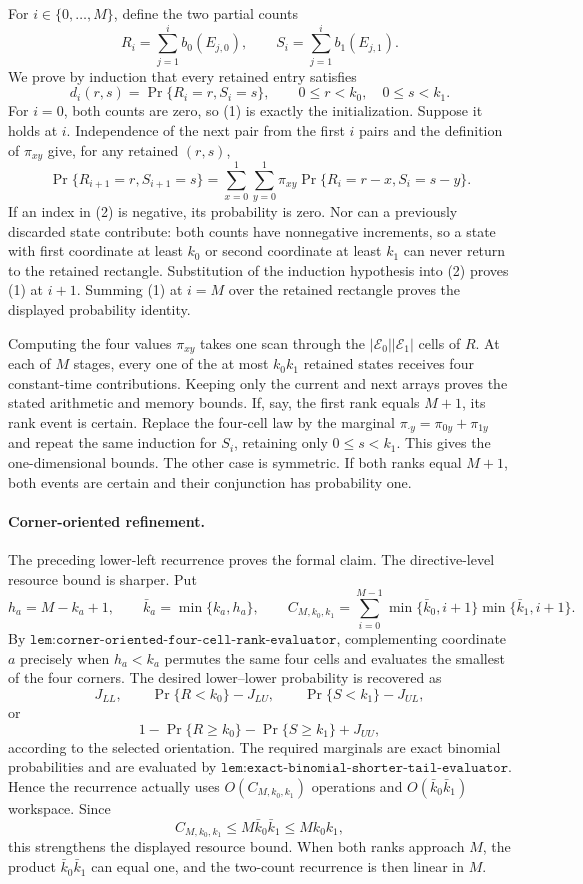 For \(i\in\{0,\ldots,M\}\), define the two partial counts
\[
R_i=\sum_{j=1}^i b_0(E_{j,0}),\qquad S_i=\sum_{j=1}^i b_1(E_{j,1}).
\]
We prove by induction that every retained entry satisfies
\[
d_i(r,s)=\Pr\{R_i=r,S_i=s\},\qquad 0\le r<k_0,\quad 0\le s<k_1.
\tag{1}
\]
For \(i=0\), both counts are zero, so (1) is exactly the initialization. Suppose it holds at \(i\). Independence of the next pair from the first \(i\) pairs and the definition of \(\pi_{xy}\) give, for any retained \((r,s)\),
\[
\Pr\{R_{i+1}=r,S_{i+1}=s\}
=\sum_{x=0}^1\sum_{y=0}^1\pi_{xy}\Pr\{R_i=r-x,S_i=s-y\}.
\tag{2}
\]
If an index in (2) is negative, its probability is zero. Nor can a previously discarded state contribute: both counts have nonnegative increments, so a state with first coordinate at least \(k_0\) or second coordinate at least \(k_1\) can never return to the retained rectangle. Substitution of the induction hypothesis into (2) proves (1) at \(i+1\). Summing (1) at \(i=M\) over the retained rectangle proves the displayed probability identity.

Computing the four values \(\pi_{xy}\) takes one scan through the \(|\mathscr E_0||\mathscr E_1|\) cells of \(R\). At each of \(M\) stages, every one of the at most \(k_0k_1\) retained states receives four constant-time contributions. Keeping only the current and next arrays proves the stated arithmetic and memory bounds. If, say, the first rank equals \(M+1\), its rank event is certain. Replace the four-cell law by the marginal \(\pi_{\cdot y}=\pi_{0y}+\pi_{1y}\) and repeat the same induction for \(S_i\), retaining only \(0\le s<k_1\). This gives the one-dimensional bounds. The other case is symmetric. If both ranks equal \(M+1\), both events are certain and their conjunction has probability one.
\paragraph{Corner-oriented refinement.}
The preceding lower-left recurrence proves the formal claim. The directive-level resource bound is sharper. Put
\[
h_a=M-k_a+1,\qquad \bar k_a=\min\{k_a,h_a\},\qquad
C_{M,k_0,k_1}=\sum_{i=0}^{M-1}
\min\{\bar k_0,i+1\}\min\{\bar k_1,i+1\}. \tag{3}
\]
By \(\texttt{lem:corner-oriented-four-cell-rank-evaluator}\), complementing coordinate \(a\) precisely when \(h_a<k_a\) permutes the same four cells and evaluates the smallest of the four corners. The desired lower--lower probability is recovered as
\[
J_{LL},\qquad
\Pr\{R<k_0\}-J_{LU},\qquad
\Pr\{S<k_1\}-J_{UL},
\]
or
\[
1-\Pr\{R\ge k_0\}-\Pr\{S\ge k_1\}+J_{UU},
\]
according to the selected orientation. The required marginals are exact binomial probabilities and are evaluated by \(\texttt{lem:exact-binomial-shorter-tail-evaluator}\). Hence the recurrence actually uses \(O(C_{M,k_0,k_1})\) operations and \(O(\bar k_0\bar k_1)\) workspace. Since
\[
C_{M,k_0,k_1}\le M\bar k_0\bar k_1\le Mk_0k_1,
\]
this strengthens the displayed resource bound. When both ranks approach \(M\), the product \(\bar k_0\bar k_1\) can equal one, and the two-count recurrence is then linear in \(M\).

